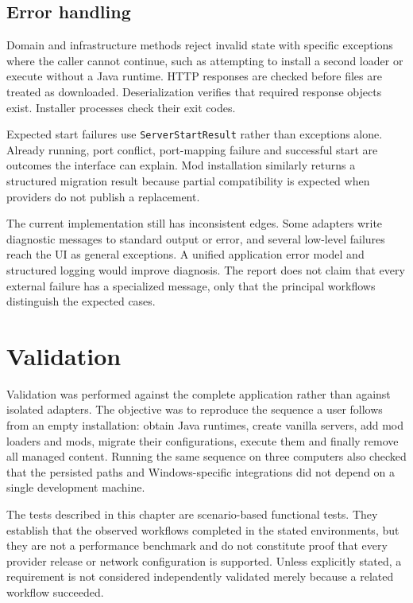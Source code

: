 \section{Error handling}

Domain and infrastructure methods reject invalid state with specific exceptions where the caller cannot continue, such as attempting to install a second loader or execute without a Java runtime. HTTP responses are checked before files are treated as downloaded. Deserialization verifies that required response objects exist. Installer processes check their exit codes.

Expected start failures use \texttt{ServerStartResult} rather than exceptions alone. Already running, port conflict, port-mapping failure and successful start are outcomes the interface can explain. Mod installation similarly returns a structured migration result because partial compatibility is expected when providers do not publish a replacement.

The current implementation still has inconsistent edges. Some adapters write diagnostic messages to standard output or error, and several low-level failures reach the UI as general exceptions. A unified application error model and structured logging would improve diagnosis. The report does not claim that every external failure has a specialized message, only that the principal workflows distinguish the expected cases.

\chapter{Validation}\label{chap:validation}

Validation was performed against the complete application rather than against isolated adapters. The objective was to reproduce the sequence a user follows from an empty installation: obtain Java runtimes, create vanilla servers, add mod loaders and mods, migrate their configurations, execute them and finally remove all managed content. Running the same sequence on three computers also checked that the persisted paths and Windows-specific integrations did not depend on a single development machine.

The tests described in this chapter are scenario-based functional tests. They establish that the observed workflows completed in the stated environments, but they are not a performance benchmark and do not constitute proof that every provider release or network configuration is supported. Unless explicitly stated, a requirement is not considered independently validated merely because a related workflow succeeded.

